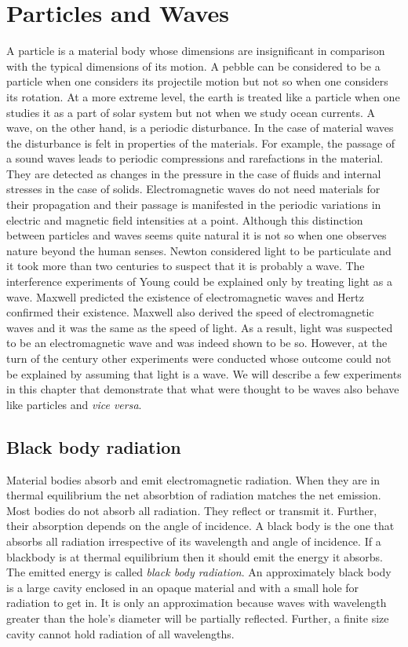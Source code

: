 \chapter{Particles and Waves}\label{c2}
A particle is a material body whose dimensions are insignificant in comparison
with the typical dimensions of its motion. A pebble can be considered to be a
particle when one considers its projectile motion but not so when one considers
its rotation. At a more extreme level, the earth is treated like a particle when
one studies it as a part of solar system but not when we study ocean currents.
A wave, on the other hand, is a periodic disturbance. In the case of material
waves the disturbance is felt in properties of the materials. For example, the
passage of a sound waves leads to periodic compressions and rarefactions in the
material. They are detected as changes in the pressure in the case of fluids and
internal stresses in the case of solids. Electromagnetic waves do not need 
materials for their propagation and their passage is manifested in the periodic
variations in electric and magnetic field intensities at a point. Although this
distinction between particles and waves seems quite natural it is not so when 
one observes nature beyond the human senses. Newton considered light to be
particulate and it took more than two centuries to suspect that it is probably
a wave. The interference experiments of Young could be explained only by 
treating light as a wave. Maxwell predicted the existence of electromagnetic
waves and Hertz confirmed their existence. Maxwell also derived the speed of
electromagnetic waves and it was the same as the speed of light. As a result,
light was suspected to be an electromagnetic wave and was indeed shown to be so.
However, at the turn of the century other experiments were conducted whose 
outcome could not be explained by assuming that light is a wave. We will 
describe a few experiments in this chapter that demonstrate that what were
thought to be waves also behave like particles and \emph{vice versa}.

\section{Black body radiation}\label{c2s1}
Material bodies absorb and emit electromagnetic radiation. When they are in
thermal equilibrium the net absorbtion of radiation matches the net emission.
Most bodies do not absorb all radiation. They reflect or transmit it. Further,
their absorption depends on the angle of incidence. A black body is the one 
that absorbs all radiation irrespective of its wavelength and angle of 
incidence. If a blackbody is at thermal equilibrium then it should emit the
energy it absorbs. The emitted energy is called \emph{black body radiation}.
An approximately black body is a large cavity enclosed in an opaque material 
and with a small hole for radiation to get in. It is only an approximation 
because waves with wavelength greater than the hole's diameter will be 
partially reflected. Further, a finite size cavity cannot hold radiation of all
wavelengths.

